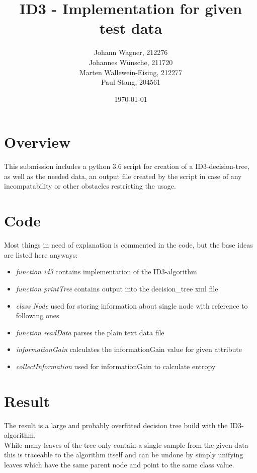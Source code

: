 \documentclass{article}
\begin{document}
\title{ID3 - Implementation for given test data}
\author{Johann Wagner, 212276 \\ Johannes Wünsche, 211720 \\ Marten Wallewein-Eising, 212277 \\ Paul Stang, 204561}
\date{\today}
\maketitle

\section*{Overview}
This submission includes a python 3.6 script for creation of a ID3-decision-tree, as well as the needed data, an output file created by the script in case of any incompatability or other obstacles restricting the usage.

\section*{Code}
Most things in need of explanation is commented in the code, but the base ideas are listed here anyways:\\
\begin{itemize}
\item \textit{function id3} contains implementation of the ID3-algorithm
\item \textit{function printTree} contains output into the decision\_tree xml file
\item \textit{class Node} used for storing information about single node with reference to following ones
\item \textit{function readData} parses the plain text data file
\item \textit{informationGain} calculates the informationGain value for given attribute
\item \textit{collectInformation} used for informationGain to calculate entropy
\end{itemize}

\section*{Result}
The result is a large and probably overfitted decision tree build with the ID3-algorithm.\\
While many leaves of the tree only contain a single sample from the given data this is traceable to the algorithm itself and can be undone by simply unifying leaves which have the same parent node and point to the same class value. 
\end{document}
